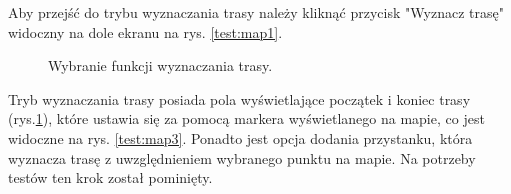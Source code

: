 Aby przejść do trybu wyznaczania trasy należy kliknąć przycisk "Wyznacz trasę" widoczny na dole ekranu na rys. \ref{test:map1}.

\setlength{\fboxrule}{0.5pt}
\begin{figure}[H]
    \centering
    \caption{Wybranie funkcji wyznaczania trasy.}
    \label{test:map2}
\end{figure}

Tryb wyznaczania trasy posiada pola wyświetlające początek i koniec trasy (rys.\ref{test:map2}), które ustawia się za pomocą markera wyświetlanego na mapie, co jest widoczne na rys. \ref{test:map3}. Ponadto jest opcja dodania przystanku, która wyznacza trasę z uwzględnieniem wybranego punktu na mapie. Na potrzeby testów ten krok został pominięty.

